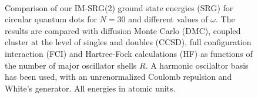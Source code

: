 \documentclass[amsmath, amssymb, aps, floatfix, nofootinbib, preprintnumbers,showpacs, superscriptaddress, twocolumn]{revtex4-1}
\begin{document}
\begin{figure}%
     \begin{center}
         \\ %
         
    \end{center}
    \caption{Comparison of our IM-SRG(2) ground state energies (SRG)
      for circular quantum dots for $N=30$ and different values of
      $\omega$. The results are compared with diffusion Monte
      Carlo (DMC), coupled cluster at the level of singles and doubles
      (CCSD), full configuration interaction (FCI) and Hartree-Fock
      calculations (HF) as functions of the number of major oscillator
      shells $R$. A harmonic oscilaltor basis has been used, with an
      unrenormalized Coulomb repulsion and White's generator. All
      energies in atomic units.}
   \label{fig:N30}
\end{figure}
\end{document}
